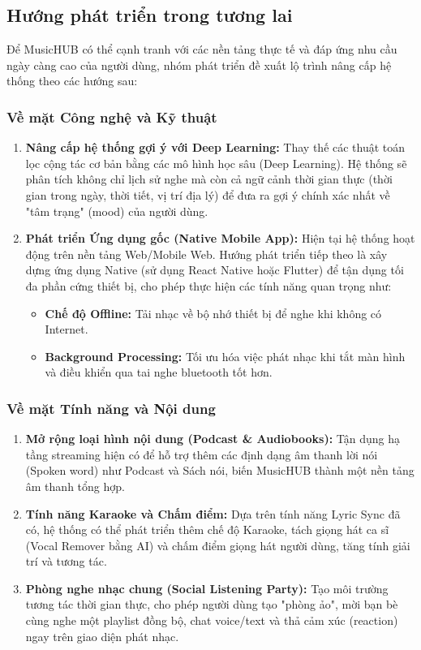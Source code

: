 \documentclass[a4paper]{article}
\newcommand{\cach}{\hspace*{1.5em}\ignorespaces}
\begin{document}
\subsection{Hướng phát triển trong tương lai}
\cach Để MusicHUB có thể cạnh tranh với các nền tảng thực tế và đáp ứng nhu cầu ngày càng cao của người dùng, nhóm phát triển đề xuất lộ trình nâng cấp hệ thống theo các hướng sau:

\subsubsection{Về mặt Công nghệ và Kỹ thuật}
\begin{enumerate}
    \item \textbf{Nâng cấp hệ thống gợi ý với Deep Learning:}
    Thay thế các thuật toán lọc cộng tác cơ bản bằng các mô hình học sâu (Deep Learning). Hệ thống sẽ phân tích không chỉ lịch sử nghe mà còn cả ngữ cảnh thời gian thực (thời gian trong ngày, thời tiết, vị trí địa lý) để đưa ra gợi ý chính xác nhất về "tâm trạng" (mood) của người dùng.
    
    \item \textbf{Phát triển Ứng dụng gốc (Native Mobile App):}
    Hiện tại hệ thống hoạt động trên nền tảng Web/Mobile Web. Hướng phát triển tiếp theo là xây dựng ứng dụng Native (sử dụng React Native hoặc Flutter) để tận dụng tối đa phần cứng thiết bị, cho phép thực hiện các tính năng quan trọng như:
    \begin{itemize}
        \item \textbf{Chế độ Offline:} Tải nhạc về bộ nhớ thiết bị để nghe khi không có Internet.
        \item \textbf{Background Processing:} Tối ưu hóa việc phát nhạc khi tắt màn hình và điều khiển qua tai nghe bluetooth tốt hơn.
    \end{itemize}
    
\end{enumerate}

\subsubsection{Về mặt Tính năng và Nội dung}
\begin{enumerate}
    \item \textbf{Mở rộng loại hình nội dung (Podcast \& Audiobooks):}
    Tận dụng hạ tầng streaming hiện có để hỗ trợ thêm các định dạng âm thanh lời nói (Spoken word) như Podcast và Sách nói, biến MusicHUB thành một nền tảng âm thanh tổng hợp.
    
    \item \textbf{Tính năng Karaoke và Chấm điểm:}
    Dựa trên tính năng Lyric Sync đã có, hệ thống có thể phát triển thêm chế độ Karaoke, tách giọng hát ca sĩ (Vocal Remover bằng AI) và chấm điểm giọng hát người dùng, tăng tính giải trí và tương tác.
    
    \item \textbf{Phòng nghe nhạc chung (Social Listening Party):}
    Tạo môi trường tương tác thời gian thực, cho phép người dùng tạo "phòng ảo", mời bạn bè cùng nghe một playlist đồng bộ, chat voice/text và thả cảm xúc (reaction) ngay trên giao diện phát nhạc.
\end{enumerate}
\end{document}
